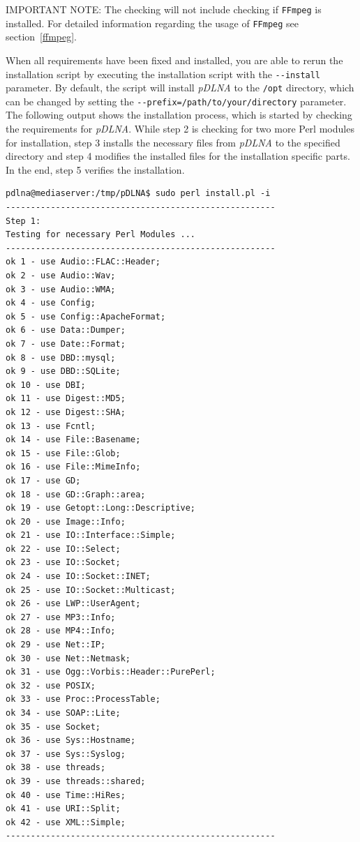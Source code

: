 \documentclass[a4paper,oneside,10pt]{report}
\newenvironment{colframecmd}{%
  \begin{Sbox}
    \begin{minipage}{.99\columnwidth}
}{%
  \end{minipage}
  \end{Sbox}
  \begin{center}
    \fcolorbox{black}{LightSteelBlue}{\TheSbox}
  \end{center}
}
\newenvironment{colframeimportantnote}{%
  \begin{Sbox}
    \begin{minipage}{.99\columnwidth}
}{%
  \end{minipage}
  \end{Sbox}
  \begin{center}
    \fcolorbox{black}{Orange}{\TheSbox}
  \end{center}
}
\begin{document}
\begin{colframeimportantnote}
\textsc{IMPORTANT NOTE:} The checking will not include checking if \verb|FFmpeg| is installed. For detailed information regarding the usage of \verb|FFmpeg| see section~\ref{ffmpeg}.
\end{colframeimportantnote}

When all requirements have been fixed and installed, you are able to rerun the installation script by executing the installation script with the \verb|--install| parameter. By default, the script will install {\em pDLNA} to the \verb|/opt| directory, which can be changed by setting the \verb|--prefix=/path/to/your/directory| parameter. The following output shows the installation process, which is started by checking the requirements for {\em pDLNA}. While step 2 is checking for two more Perl modules for installation, step 3 installs the necessary files from {\em pDLNA} to the specified directory and step 4 modifies the installed files for the installation specific parts. In the end, step 5 verifies the installation.
\begin{colframecmd}
\begin{verbatim}
pdlna@mediaserver:/tmp/pDLNA$ sudo perl install.pl -i
------------------------------------------------------
Step 1:
Testing for necessary Perl Modules ...
------------------------------------------------------
ok 1 - use Audio::FLAC::Header;
ok 2 - use Audio::Wav;
ok 3 - use Audio::WMA;
ok 4 - use Config;
ok 5 - use Config::ApacheFormat;
ok 6 - use Data::Dumper;
ok 7 - use Date::Format;
ok 8 - use DBD::mysql;
ok 9 - use DBD::SQLite;
ok 10 - use DBI;
ok 11 - use Digest::MD5;
ok 12 - use Digest::SHA;
ok 13 - use Fcntl;
ok 14 - use File::Basename;
ok 15 - use File::Glob;
ok 16 - use File::MimeInfo;
ok 17 - use GD;
ok 18 - use GD::Graph::area;
ok 19 - use Getopt::Long::Descriptive;
ok 20 - use Image::Info;
ok 21 - use IO::Interface::Simple;
ok 22 - use IO::Select;
ok 23 - use IO::Socket;
ok 24 - use IO::Socket::INET;
ok 25 - use IO::Socket::Multicast;
ok 26 - use LWP::UserAgent;
ok 27 - use MP3::Info;
ok 28 - use MP4::Info;
ok 29 - use Net::IP;
ok 30 - use Net::Netmask;
ok 31 - use Ogg::Vorbis::Header::PurePerl;
ok 32 - use POSIX;
ok 33 - use Proc::ProcessTable;
ok 34 - use SOAP::Lite;
ok 35 - use Socket;
ok 36 - use Sys::Hostname;
ok 37 - use Sys::Syslog;
ok 38 - use threads;
ok 39 - use threads::shared;
ok 40 - use Time::HiRes;
ok 41 - use URI::Split;
ok 42 - use XML::Simple;
------------------------------------------------------
\end{verbatim}
\end{colframecmd}
\end{document}
